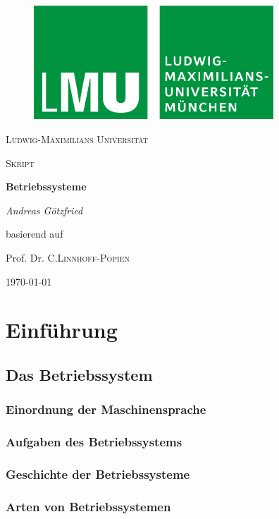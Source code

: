 \documentclass{article}
\begin{document}
\begin{titlepage}
\centering
    \begin{figure}
    \centering
	    \includegraphics[width=90mm]{logo_lmu.jpg}
    \end{figure}
	{\scshape\LARGE Ludwig-Maximilians Universität \par}
	\vspace{1cm}
	{\scshape\Large Skript \par}
	\vspace{1.5cm}
	{\huge\bfseries Betriebssysteme\par}
	\vspace{2cm}
	{\Large\itshape Andreas Götzfried\par}
    \vfill
	    basierend auf\par
	    Prof. Dr. C.\textsc{Linnhoff-Popien}
    \vfill
	{\large \today\par}
\end{titlepage}
\tableofcontents{}

\newpage
\section{Einführung}
\subsection{Das Betriebssystem}
\subsubsection{Einordnung der Maschinensprache}
\subsubsection{Aufgaben des Betriebssystems}
\subsubsection{Geschichte der Betriebssysteme}
\subsubsection{Arten von Betriebssystemen}
\end{document}
